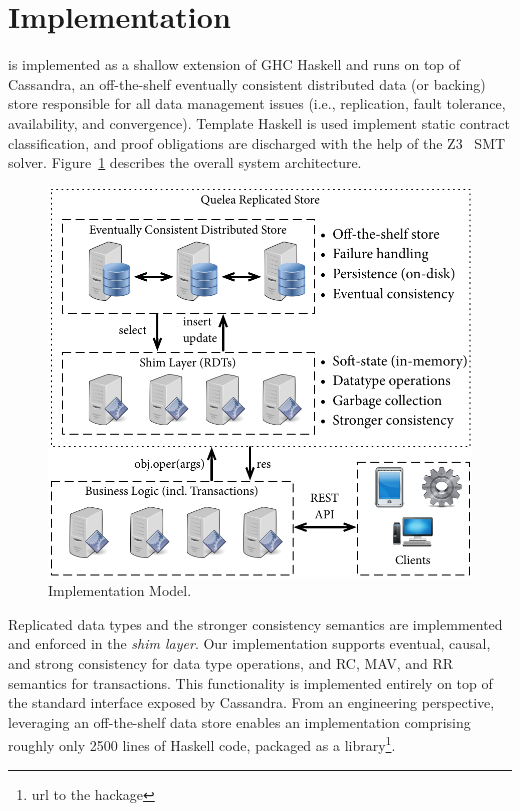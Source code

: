 \section{Implementation}

\name is implemented as a shallow extension of GHC Haskell and runs on top
of Cassandra, an off-the-shelf eventually consistent distributed data (or
backing) store responsible for all data management issues (i.e.,
replication, fault tolerance, availability, and convergence).  Template
Haskell is used implement static contract classification, and proof
obligations are discharged with the help of the Z3~\cite{} SMT
solver. Figure~\ref{fig:impl_mod} describes the overall system architecture.

\begin{figure}
\begin{center}
\includegraphics[width=0.9\columnwidth]{Figures/ImplModel}
\end{center}
\caption{Implementation Model.}
\label{fig:impl_mod}
\end{figure}

Replicated data types and the stronger consistency semantics are
implemmented and enforced in the \emph{shim layer}. Our implementation
supports eventual, causal, and strong consistency for data type operations,
and RC, MAV, and RR semantics for transactions.  This functionality is
implemented entirely on top of the standard interface exposed by Cassandra.
From an engineering perspective, leveraging an off-the-shelf data store
enables an implementation comprising roughly only 2500 lines of Haskell
code, packaged as a library\footnote{url to the hackage}.

